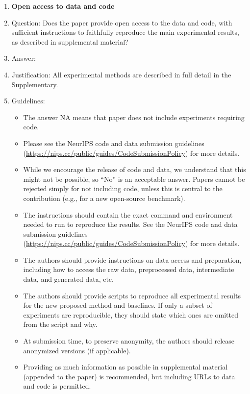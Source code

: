 \documentclass{article}
\theoremstyle{definition} \newtheorem{definition}{Definition}  \newtheorem{example}{Example}
\theoremstyle{remark} \newtheorem{remark}{Remark}
\newcounter{ct}
\begin{document}
\begin{enumerate}
\item {\bf Open access to data and code}
    \item[] Question: Does the paper provide open access to the data and code, with sufficient instructions to faithfully reproduce the main experimental results, as described in supplemental material?
    \item[] Answer: \answerYes{} %
    \item[] Justification: All experimental methods are described in full detail in the Supplementary. 
    \item[] Guidelines:
    \begin{itemize}
        \item The answer NA means that paper does not include experiments requiring code.
        \item Please see the NeurIPS code and data submission guidelines (\url{https://nips.cc/public/guides/CodeSubmissionPolicy}) for more details.
        \item While we encourage the release of code and data, we understand that this might not be possible, so ``No'' is an acceptable answer. Papers cannot be rejected simply for not including code, unless this is central to the contribution (e.g., for a new open-source benchmark).
        \item The instructions should contain the exact command and environment needed to run to reproduce the results. See the NeurIPS code and data submission guidelines (\url{https://nips.cc/public/guides/CodeSubmissionPolicy}) for more details.
        \item The authors should provide instructions on data access and preparation, including how to access the raw data, preprocessed data, intermediate data, and generated data, etc.
        \item The authors should provide scripts to reproduce all experimental results for the new proposed method and baselines. If only a subset of experiments are reproducible, they should state which ones are omitted from the script and why.
        \item At submission time, to preserve anonymity, the authors should release anonymized versions (if applicable).
        \item Providing as much information as possible in supplemental material (appended to the paper) is recommended, but including URLs to data and code is permitted.
    \end{itemize}



\end{enumerate}
\end{document}
